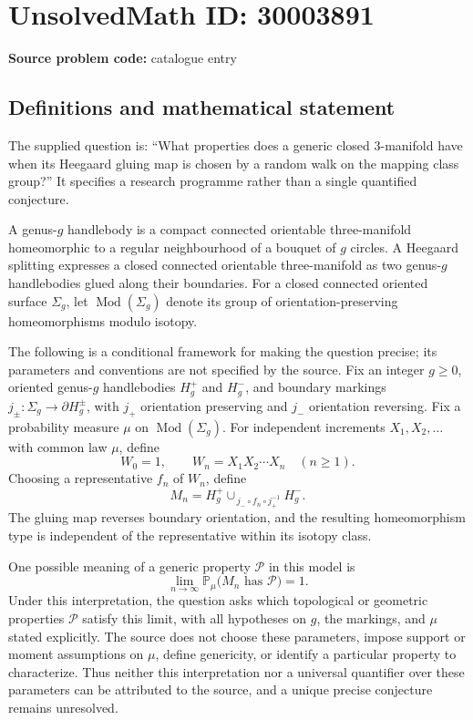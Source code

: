\documentclass[11pt]{article}
\begin{document}
\section*{UnsolvedMath ID: 30003891}
\textbf{Source problem code:} catalogue entry
\subsection{Definitions and mathematical statement}
The supplied question is: ``What properties does a generic closed 3-manifold have when its Heegaard gluing map is chosen by a random walk on the mapping class group?'' It specifies a research programme rather than a single quantified conjecture.

A genus-\(g\) handlebody is a compact connected orientable three-manifold homeomorphic to a regular neighbourhood of a bouquet of \(g\) circles. A Heegaard splitting expresses a closed connected orientable three-manifold as two genus-\(g\) handlebodies glued along their boundaries. For a closed connected oriented surface \(\Sigma_g\), let \(\operatorname{Mod}(\Sigma_g)\) denote its group of orientation-preserving homeomorphisms modulo isotopy.

The following is a conditional framework for making the question precise; its parameters and conventions are not specified by the source. Fix an integer \(g\geq 0\), oriented genus-\(g\) handlebodies \(H_g^+\) and \(H_g^-\), and boundary markings \(j_\pm:\Sigma_g\to\partial H_g^\pm\), with \(j_+\) orientation preserving and \(j_-\) orientation reversing. Fix a probability measure \(\mu\) on \(\operatorname{Mod}(\Sigma_g)\). For independent increments \(X_1,X_2,\ldots\) with common law \(\mu\), define
\[
W_0=1,\qquad W_n=X_1X_2\cdots X_n\quad(n\geq1).
\]
Choosing a representative \(f_n\) of \(W_n\), define
\[
M_n=H_g^+\mathbin{\cup_{\,j_-\circ f_n\circ j_+^{-1}}}H_g^-.
\]
The gluing map reverses boundary orientation, and the resulting homeomorphism type is independent of the representative within its isotopy class.

One possible meaning of a generic property \(\mathcal P\) in this model is
\[
\lim_{n\to\infty}\mathbb P_\mu\bigl(M_n\text{ has }\mathcal P\bigr)=1.
\]
Under this interpretation, the question asks which topological or geometric properties \(\mathcal P\) satisfy this limit, with all hypotheses on \(g\), the markings, and \(\mu\) stated explicitly. The source does not choose these parameters, impose support or moment assumptions on \(\mu\), define genericity, or identify a particular property to characterize. Thus neither this interpretation nor a universal quantifier over these parameters can be attributed to the source, and a unique precise conjecture remains unresolved.
\end{document}
